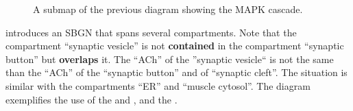 \begin{figure}[b]
\begin{center}
\caption{A submap of the previous diagram showing the MAPK cascade.}\label{fig:mapk}
\end{center}
\end{figure}

 introduces an SBGN \PD that spans several compartments. Note that the compartment ``synaptic vesicle'' is not \textbf{contained} in the compartment ``synaptic button'' but \textbf{overlaps} it. The  ``ACh'' of the ''synaptic vesicle`` is not the same  than the ``ACh'' of the ``synaptic button'' and of ``synaptic cleft''.  The situation is similar with the compartments ``ER'' and ``muscle cytosol''.  The diagram exemplifies the use of the   and , and the  .

